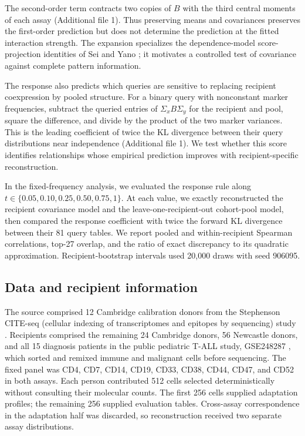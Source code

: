 \documentclass[pdflatex,sn-vancouver-num,iicol]{sn-jnl}
\begin{document}
The second-order term contracts two copies of $B$ with the third central
moments of each assay (Additional file 1). Thus preserving means and
covariances preserves the first-order prediction but does not determine the
prediction at the fitted interaction strength. The expansion specializes the dependence-model
score-projection identities of Sei and Yano \cite{sei}; it motivates a controlled test
of covariance against complete pattern information.

The response also predicts which queries are sensitive to replacing recipient
coexpression by pooled structure. For a binary query with nonconstant marker
frequencies, subtract the queried entries of $\Sigma_x B\Sigma_y$ for the
recipient and pool, square the difference, and divide by the product of the
two marker variances. This is the leading coefficient of twice the KL divergence
between their query distributions near independence
(Additional file 1). We test whether this score identifies relationships
whose empirical prediction improves with recipient-specific reconstruction.

In the fixed-frequency analysis, we evaluated the response rule along
$t\in\{0.05,0.10,0.25,0.50,0.75,1\}$. At each value, we exactly reconstructed
the recipient covariance model and the leave-one-recipient-out cohort-pool
model, then compared the response coefficient with twice the forward KL
divergence between their 81 query tables. We report pooled and within-recipient
Spearman correlations, top-27 overlap, and the ratio of exact discrepancy to
its quadratic approximation. Recipient-bootstrap intervals used 20,000 draws
with seed 906095.

\subsection{Data and recipient information}
The source comprised 12 Cambridge calibration donors from the Stephenson
CITE-seq (cellular indexing of transcriptomes and epitopes by sequencing)
study \cite{stephenson2021}. Recipients comprised the remaining 24
Cambridge donors, 56 Newcastle donors, and all 15 diagnosis patients in the
public pediatric T-ALL study, GSE248287 \cite{wiggers}, which sorted and remixed
immune and malignant cells before sequencing. The fixed panel was
CD4, CD7, CD14, CD19, CD33, CD38, CD44, CD47, and CD52 in both assays.
Each person contributed 512 cells selected deterministically without consulting
their molecular counts. The first 256 cells supplied adaptation profiles;
the remaining 256 supplied evaluation tables. Cross-assay correspondence in
the adaptation half was discarded, so reconstruction received two separate
assay distributions.
\end{document}
